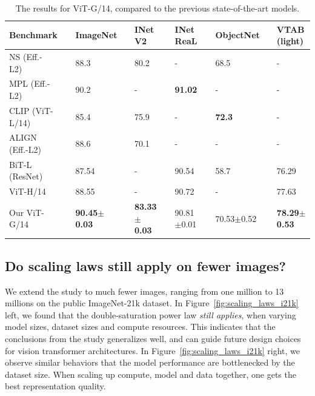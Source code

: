 \begin{table}[t]
  \setlength{\tabcolsep}{0pt}
  \setlength{\extrarowheight}{5pt}
  \renewcommand{\arraystretch}{0.75}
  \centering
  \caption{The results for ViT-G/14, compared to the previous state-of-the-art models.}\label{table:sota}
  \begin{tabularx}{\linewidth}{p{3.2cm}p{0.1cm}Cp{0.1cm}Cp{0.1cm}Cp{0.1cm}Cp{0.1cm}C}
    \toprule[1pt]
     \bf{Benchmark} && \bf{ImageNet} && \bf{INet V2} && \bf{INet ReaL} && \bf{ObjectNet} && \bf{VTAB (light)} \\
    \midrule
     NS (Eff.-L2)~\cite{xie2019selftraining} && 88.3 && 80.2 && - && 68.5 && - \\
     MPL (Eff.-L2)~\cite{pham2020meta} && 90.2 && - && \textbf{91.02} && - && - \\
     CLIP (ViT-L/14)~\cite{radford2021learning} && 85.4 && 75.9 && - && \textbf{72.3} && -\\
     ALIGN (Eff.-L2)~\cite{jia2021scaling} && 88.6 && 70.1 && - && - && -\\
     BiT-L (ResNet)~\cite{kolesnikov2019big} && 87.54 && - && 90.54 && 58.7 && 76.29\\
     ViT-H/14~\cite{dosovitskiy2020} && 88.55 && - && 90.72 && - && 77.63 \\
     \midrule
     Our ViT-G/14 && \textbf{90.45$\pm$0.03} && \textbf{83.33$\pm$0.03}  && 90.81$\pm$0.01 && 70.53$\pm$0.52 && \textbf{78.29$\pm$0.53} \\ 
    \bottomrule[1pt]
  \end{tabularx}
\end{table}

\subsection{Do scaling laws still apply on fewer images?}\label{sec:public}

We extend the study to much fewer images, ranging from one million to 13 millions on the public ImageNet-21k dataset. 
In Figure~\ref{fig:scaling_laws_i21k} left, we found that the double-saturation power law \textit{still applies}, when varying model sizes, dataset sizes and compute resources. 
This indicates that the conclusions from the study generalizes well, and can guide future design choices for vision transformer architectures.
In Figure~\ref{fig:scaling_laws_i21k} right, we observe similar behaviors that the model performance are bottlenecked by the dataset size. 
When scaling up compute, model and data together, one gets the best representation quality.

